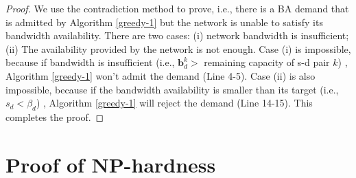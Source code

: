\documentclass[sigconf]{acmart}
\begin{document}
\begin{appendices}
\begin{proof}
We use the contradiction method to prove, i.e., there is a BA demand that is admitted by Algorithm \ref{greedy-1} but the network is unable to satisfy its bandwidth availability.
There are two cases: (i) network bandwidth is insufficient; (ii) The availability provided by the network is not enough. 
Case (i) is impossible, because if bandwidth is insufficient (i.e., $\mathbf{b}^k_d>$ remaining capacity of s-d pair $k$) , Algorithm \ref{greedy-1} won't admit the demand (Line 4-5).
Case (ii) is also impossible, because if the bandwidth availability is smaller than its target (i.e., $s_d <   \beta_{d}$) , Algorithm \ref{greedy-1} will reject the demand (Line 14-15).
This completes the proof. 
\end{proof}


\section{Proof of NP-hardness} \label{appendix1}


\end{appendices}
\end{document}
